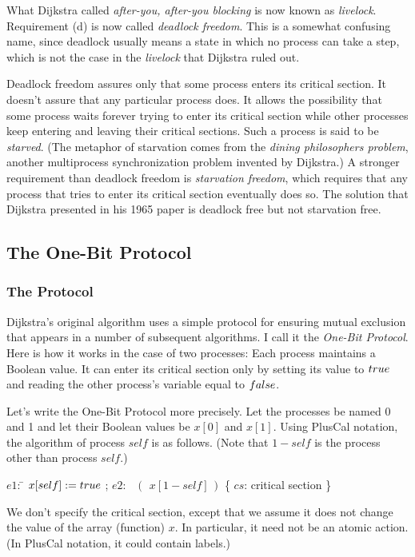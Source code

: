 \documentclass[fleqn,leqno]{article}
\begin{document}
What Dijkstra called \emph{after-you, after-you blocking} is now known
as 
\emph{livelock}.  Requirement (d) is now called
\emph{deadlock 
freedom}.  This is a somewhat confusing name, since
deadlock usually means a state in which no process can take a step,
which is not the case in the \emph{livelock} that Dijkstra ruled out.


Deadlock freedom assures only that some process enters its critical
section.  It doesn't assure that any particular process does.  
It allows the possibility that some process waits forever
trying to enter its critical section while other processes keep
entering and leaving their critical sections.  Such a process is said
to be \emph{starved}.  (The metaphor of starvation comes from the
\emph{dining 
philosophers problem}, another multiprocess
synchronization problem invented by Dijkstra.)  A stronger requirement
than deadlock freedom is 
\emph{starvation 
freedom}, which requires
that any process that tries to enter its critical section eventually
does so.  The solution that Dijkstra presented in his 1965 paper is
deadlock free but not starvation free.


\subsection{The One-Bit Protocol}

\subsubsection{The Protocol}

Dijkstra's original algorithm uses a simple protocol for ensuring
mutual exclusion that appears in a number of subsequent algorithms.  I
call it the \emph{One-Bit Protocol}.  Here is how it works in the case
of two processes: Each process maintains a Boolean value.  It can
enter its critical section only by setting its value to $\TRUE$ and
reading the other process's variable equal to $\FALSE$.

Let's write the One-Bit Protocol more precisely.  Let the processes be
named 0 and 1 and let their Boolean values be $x[0]$ and $x[1]$.  Using
PlusCal notation, the algorithm of process $self$ is as follows.
(Note that $1-self$ is the process other than process $self$.)
\begin{display}
\begin{tabbing}
$e1$: \= $x[self] := \TRUE$ ; 
$e2$: \> \pif\ $(\,~x[1\!-\!self]\,)$ \{ $cs$: critical section \} 
\end{tabbing}
\end{display}
We don't specify the critical section, except that we assume it does not
change the value of the array (function) $x$.  In particular, it need
not be an atomic action.  (In PlusCal notation, it could contain
labels.)
\end{document}
